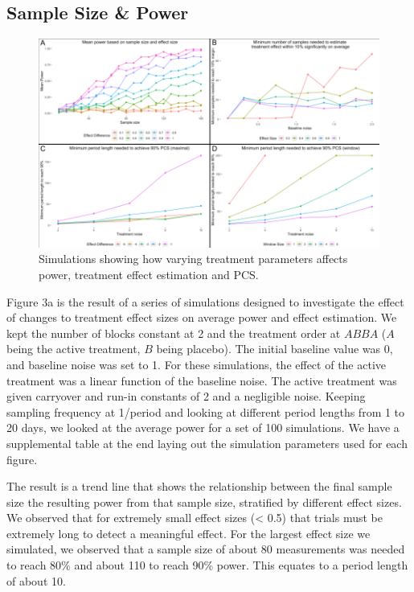\documentclass[11pt,]{article}
\begin{document}
\subsection{Sample Size \& Power}\label{sample-size-power}

\begin{figure}

{\centering \includegraphics[width=0.9\linewidth]{./img/term-paper-fig-3} 

}

\caption{Simulations showing how varying treatment parameters affects power, treatment effect estimation and PCS.}\label{fig:unnamed-chunk-4}
\end{figure}

Figure 3a is the result of a series of simulations designed to
investigate the effect of changes to treatment effect sizes on average
power and effect estimation. We kept the number of blocks constant at 2
and the treatment order at \(ABBA\) (\(A\) being the active treatment,
\(B\) being placebo). The initial baseline value was 0, and baseline
noise was set to 1. For these simulations, the effect of the active
treatment was a linear function of the baseline noise. The active
treatment was given carryover and run-in constants of 2 and a negligible
noise. Keeping sampling frequency at 1/period and looking at different
period lengths from 1 to 20 days, we looked at the average power for a
set of 100 simulations. We have a supplemental table at the end laying
out the simulation parameters used for each figure.

The result is a trend line that shows the relationship between the final
sample size the resulting power from that sample size, stratified by
different effect sizes. We observed that for extremely small effect
sizes (\textless{} 0.5) that trials must be extremely long to detect a
meaningful effect. For the largest effect size we simulated, we observed
that a sample size of about 80 measurements was needed to reach 80\% and
about 110 to reach 90\% power. This equates to a period length of about
10.
\end{document}
